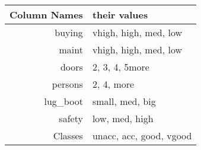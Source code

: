 \begin{tabular}{rl}
\toprule
Column Names & their values \\
\midrule
buying               &   vhigh, high, med, low \\
maint & vhigh, high, med, low\\
doors & 2, 3, 4, 5more\\
persons & 2, 4, more\\
lug\_boot & small, med, big\\
safety & low, med, high\\
Classes & unacc, acc, good, vgood\\
\bottomrule
\end{tabular}
